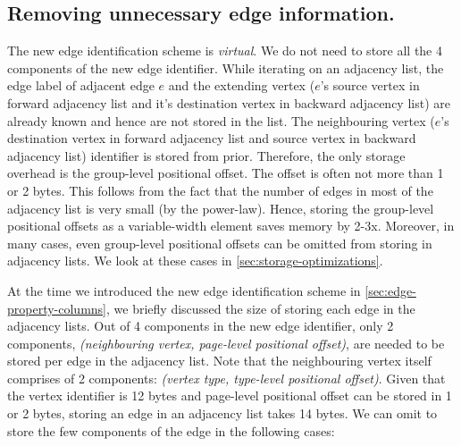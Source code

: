 \subsection{Removing unnecessary edge information.}

The new edge identification scheme is \emph{virtual}. We do not need to store all the 4 components of the new edge identifier. While iterating on an adjacency list, the edge label of adjacent edge $e$ and the extending vertex ($e$'s source vertex in forward adjacency list and it's destination vertex in backward adjacency list) are already known and hence are not stored in the list. The neighbouring vertex ($e$'s destination vertex in forward adjacency list and source vertex in backward adjacency list) identifier is stored from prior. Therefore, the only storage overhead is the group-level positional offset. The offset is often not more than 1 or 2 bytes. This follows from the fact that the number of edges in most of the adjacency list is very small (by the power-law). Hence, storing the group-level positional offsets as a variable-width element saves memory by 2-3x. Moreover, in many cases, even group-level positional offsets can be omitted from storing in adjacency lists. We look at these cases in \ref{sec:storage-optimizations}.

At the time we introduced the new edge identification scheme in \ref{sec:edge-property-columns}, we briefly discussed the size of storing each edge in the adjacency lists. Out of 4 components in the new edge identifier, only 2 components, \emph{(neighbouring vertex, page-level positional offset)}, are needed to be stored per edge in the adjacency list. Note that the neighbouring vertex itself comprises of 2 components: \emph{(vertex type, type-level positional offset)}. Given that the vertex identifier is 12 bytes and page-level positional offset can be stored in 1 or 2 bytes, storing an edge in an adjacency list takes 14 bytes. We can omit to store the few components of the edge in the following cases: 

